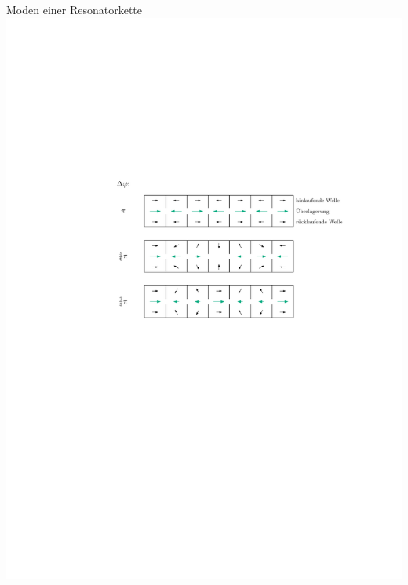 \documentclass[12pt,xcolor=dvipsnames,professionalfonts]{beamer}
\begin{document}
\begin{frame}{Moden einer Resonatorkette}
	\includegraphics[scale=0.9]{./figures/phasoren_top.pdf}
\end{frame}
\end{document}
